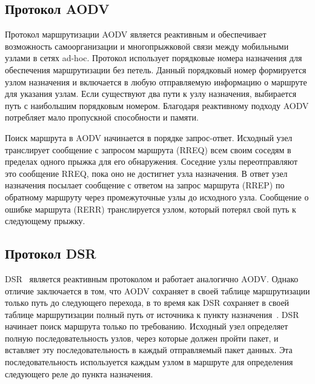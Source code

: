\subsection*{Протокол AODV}

Протокол маршрутизации AODV является реактивным и обеспечивает возможность самоорганизации и многопрыжковой связи между мобильными узлами в сетях ad-hoc. Протокол использует порядковые номера назначения для обеспечения маршрутизации без петель. Данный порядковый номер формируется узлом назначения и включается в любую отправляемую информацию о маршруте для указания узлам. Если существуют два пути к узлу назначения, выбирается путь с наибольшим порядковым номером. Благодаря реактивному подходу AODV потребляет мало пропускной способности и памяти.~\cite{pande2021performance}

Поиск маршрута в AODV начинается в порядке запрос-ответ. Исходный узел транслирует сообщение с запросом маршрута (RREQ) всем своим соседям в пределах одного прыжка для его обнаружения. Соседние узлы переотправляют это сообщение RREQ, пока оно не достигнет узла назначения. В ответ узел назначения посылает сообщение с ответом на запрос маршрута (RREP) по обратному маршруту через промежуточные узлы до исходного узла. Сообщение о ошибке маршрута (RERR) транслируется узлом, который потерял свой путь к следующему прыжку.

\subsection*{Протокол DSR}

DSR~\cite{johnson2001dsr} является реактивным протоколом и работает аналогично AODV. Однако отличие заключается в том, что AODV сохраняет в своей таблице маршрутизации только путь до следующего перехода, в то время как DSR сохраняет в своей таблице маршрутизации полный путь от источника к пункту назначения~\cite{bai2006doa}. DSR начинает поиск маршрута только по требованию. Исходный узел определяет полную последовательность узлов, через которые должен пройти пакет, и вставляет эту последовательность в каждый отправляемый пакет данных. Эта последовательность используется каждым узлом в маршруте для определения следующего реле до пункта назначения.